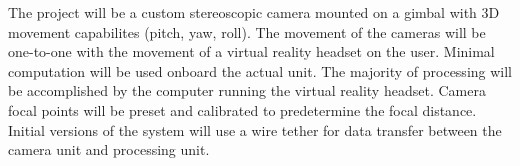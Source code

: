 The project will be a custom stereoscopic camera mounted on a gimbal with 3D movement capabilites (pitch, yaw, roll). The movement of the cameras will be one-to-one with the movement of a virtual reality headset on the user. Minimal computation will be used onboard the actual unit. The majority of processing will be accomplished by the computer running the virtual reality headset. Camera focal points will be preset and calibrated to predetermine the focal distance. Initial versions of the system will use a wire tether for data transfer between the camera unit and processing unit.